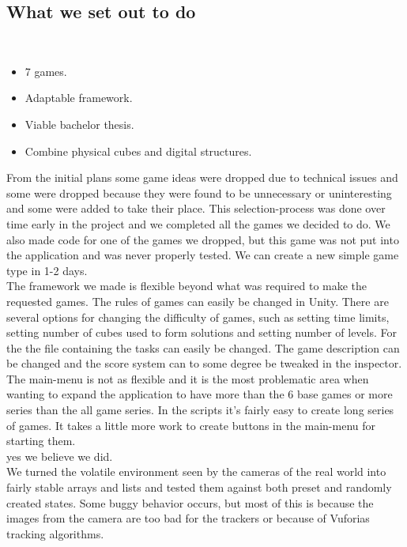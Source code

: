 \subsection{What we set out to do}

\begin{description}
	\item {}

	\item[Result goals]\ 
	\begin{itemize}
		\item 7 games.
		\item Adaptable framework.
		\item Viable bachelor thesis.
		\item Combine physical cubes and digital structures.
	\end{itemize}
	From the initial plans some game ideas were dropped due to technical issues and some were dropped because they were found to be unnecessary or uninteresting and some were added to take their place. 
	This selection-process was done over time early in the project and we completed all the games we decided to do. 
	We also made code for one of the games we dropped, but this game was not put into the application and was never properly tested. 
	We can create a new simple game type in 1-2 days.\\
	The framework we made is flexible beyond what was required to make the requested games. 
	The rules of games can easily be changed in Unity. 
	There are several options for changing the difficulty of games, such as setting time limits, setting number of cubes used to form solutions and setting number of levels. 
	For the \nameref{game:wo0ord_game} the file containing the tasks can easily be changed. 
	The game description can be changed and the score system can to some degree be tweaked in the inspector. 
	The main-menu is not as flexible and it is the most problematic area when wanting to expand the application to have more than the 6 base games or more series than the all game series. 
	In the scripts it's fairly easy to create long series of games. It takes a little more work to create buttons in the main-menu for starting them.\\
	\todo{did we do enough work?}
	yes we believe we did.\\

	We turned the volatile environment seen by the cameras of the real world
	into fairly stable arrays and lists and tested them against both preset 
	and randomly created states. Some buggy behavior occurs, but most of this
	is because the images from the camera are too bad for the trackers or because
	of Vuforias tracking algorithms.\\


\end{description}
